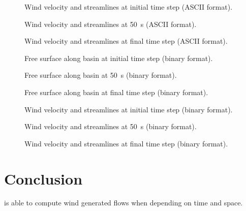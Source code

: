 \begin{figure}[H]
 \centering
 \caption{Wind velocity and streamlines at initial time step (ASCII format).}
 \label{t2d:windtxy:fig:Velo0}
\end{figure}

\begin{figure}[H]
 \centering
 \caption{Wind velocity and streamlines at 50~s (ASCII format).}
 \label{t2d:windtxy:fig:Velo50s}
\end{figure}

\begin{figure}[H]
 \centering
 \caption{Wind velocity and streamlines at final time step (ASCII format).}
 \label{t2d:windtxy:fig:Velotf}
\end{figure}

\begin{figure}[H]
 \centering
 \caption{Free surface along basin at initial time step (binary format).}
 \label{t2d:windtxy:fig:FreeSurfbin0}
\end{figure}

\begin{figure}[H]
 \centering
 \caption{Free surface along basin at 50~s (binary format).}
 \label{t2d:windtxy:fig:FreeSurfbin50s}
\end{figure}

\begin{figure}[H]
 \centering
 \caption{Free surface along basin at final time step (binary format).}
 \label{t2d:windtxy:fig:FreeSurfbintf}
\end{figure}

\begin{figure}[H]
 \centering
 \caption{Wind velocity and streamlines at initial time step (binary format).}
 \label{t2d:windtxy:fig:Velobin0}
\end{figure}

\begin{figure}[H]
 \centering
 \caption{Wind velocity and streamlines at 50~s (binary format).}
 \label{t2d:windtxy:fig:Velobin50s}
\end{figure}

\begin{figure}[H]
 \centering
 \caption{Wind velocity and streamlines at final time step (binary format).}
 \label{t2d:windtxy:fig:Velobintf}
\end{figure}

\section{Conclusion}
 is able to compute wind generated flows when depending on time and space.
